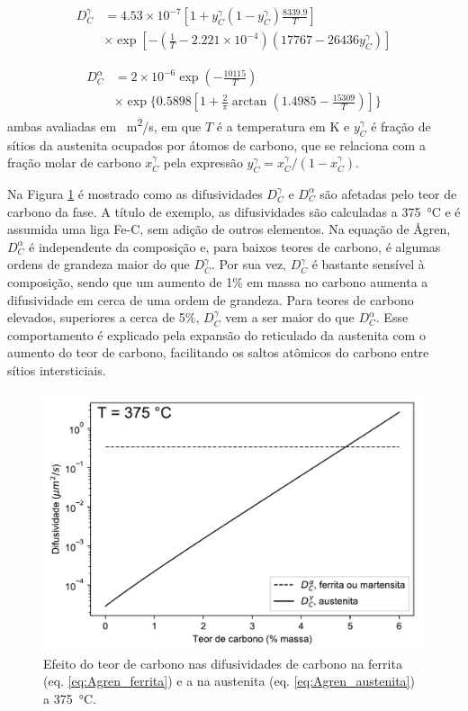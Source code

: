 \begin{align}
  D_C^\gamma &= 4.53 \times 10^{-7} \left[ 1 + y_C^\gamma \left(1 - y_C^\gamma\right) \frac{8339.9}{T} \right] \nonumber \\
  & \times \exp \left[ - \left( \frac{1}{T} - 2.221 \times 10^{-4} \right) \left( 17767 - 26436 y_C^\gamma \right) \right] \label{eq:Agren_austenita}
\end{align}

\begin{align}
  D_C^\alpha &= 2 \times 10^{-6} \exp \left(-\frac{10115}{T} \right) \nonumber \\
  & \times \exp \Bigg\{0.5898 \left[1 + \frac{2}{\pi} \arctan \left(1.4985 - \frac{15309}{T}\right)\right] \Bigg\} \label{eq:Agren_ferrita}
\end{align}
%
ambas avaliadas em \SI{}{m^2/s}, em que $T$ é a temperatura em K e $y_C^\gamma$ é fração de sítios da austenita ocupados por átomos de carbono, que se relaciona com a fração molar de carbono $x_C^\gamma$ pela expressão $y_C^\gamma = x_C^\gamma / (1 - x_C^\gamma)$.





Na Figura \ref{fig:difusividades} é mostrado como as difusividades $D_C^\gamma$ e $D_C^\alpha$ são afetadas pelo teor de carbono da fase. A título de exemplo, as difusividades são calculadas a \SI{375}{\degreeCelsius} e é assumida uma liga Fe-C, sem adição de outros elementos. Na equação de {\AA}gren, $D_C^\alpha$ é independente da composição e, para baixos teores de carbono, é algumas ordens de grandeza maior do que $D_C^\gamma$. Por sua vez, $D_C^\gamma$ é bastante sensível à composição, sendo que um aumento de 1\% em massa no carbono aumenta a difusividade em cerca de uma ordem de grandeza. Para teores de carbono elevados, superiores a cerca de 5\%, $D_C^\gamma$ vem a ser maior do que $D_C^\alpha$. Esse comportamento é explicado pela expansão do reticulado da austenita com o aumento do teor de carbono, facilitando os saltos atômicos do carbono entre sítios intersticiais. %

\begin{figure}
  \includegraphics[width=.8\textwidth]{img/difusividades_carbono.pdf}
  \caption{Efeito do teor de carbono nas difusividades de carbono na ferrita (eq. \ref{eq:Agren_ferrita}) e a na austenita (eq. \ref{eq:Agren_austenita}) a \SI{375}{\degreeCelsius}.}
  \label{fig:difusividades}
\end{figure}

